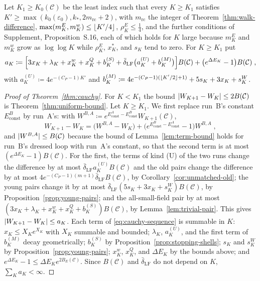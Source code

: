 \documentclass[11pt]{preprint}
\DeclarePairedDelimiter{\abs}{\lvert}{\rvert}
\DeclarePairedDelimiter{\floor}{\lfloor}{\rfloor}
\numberwithin{equation}{section}
\theoremstyle{definition}
\theoremstyle{remark}
\theoremstyle{plain}
\begin{document}
Let $K_1 \geq K_0(\mathcal C)$ be the least index such that every $K \geq K_1$ satisfies $K' \geq \max(k_0(\varepsilon_0), k_*, 2m_{\mathrm{rc}} + 2)$, with $m_{\mathrm{rc}}$ the integer of Theorem~\ref{thm:walk-difference}, $\max(m^E_K, m^w_K) \leq \floor{K'/4}$, $\rho^E_K \leq \frac14$, and the further conditions of Supplement, Proposition~S.16, each of which holds for $K$ large because $m^E_K$ and $m^w_K$ grow as $\log\log K$ while $\rho^E_K$, $x^*_K$, and $s_K$ tend to zero. For $K \geq K_1$ put
\begin{equation}\label{eq:cauchy-sequence}
    a_K \coloneqq \Bigl[3x_K + \lambda_K + x^w_K + x^Q_K + b^{(S)}_K + \bar\delta_{\mathrm{LF}}\bigl(a^{(U)}_K + b^{(M)}_K\bigr)\Bigr]B(\mathcal C) + \bigl(e^{\Delta E_K} - 1\bigr)B(\mathcal C)\;,
\end{equation}
with $a^{(U)}_K \coloneqq 4e^{-(C_P-1)K'}$ and $b^{(M)}_K \coloneqq 4e^{-(C_P-1)(\floor{K'/2}+1)} + 5s_K + 3x_K + s^W_K$.

\begin{proof}[Proof of Theorem~\ref{thm:cauchy}]
For $K < K_1$ the bound $\abs{W_{K+1} - W_K} \leq 2B(\mathcal C)$ is Theorem~\ref{thm:uniform-bound}. Let $K \geq K_1$. We first replace run~B's constant $E^B_{\mathrm{const}}$ by run~A's: with $W^{B,A} \coloneqq e^{E^A_{\mathrm{const}} - E^B_{\mathrm{const}}}W_{K+1}(\mathcal C)$,
\begin{equation}\label{eq:constant-swap}
    W_{K+1} - W_K = \bigl(W^{B,A} - W_K\bigr) + \bigl(e^{E^B_{\mathrm{const}} - E^A_{\mathrm{const}}} - 1\bigr)W^{B,A}\;,
\end{equation}
and $\abs{W^{B,A}} \leq B(\mathcal C)$ because the bound of Lemma~\ref{lem:term-bound} holds for run~B's dressed loop with run~A's constant, so that the second term is at most $(e^{\Delta E_K} - 1)B(\mathcal C)$. For the first, the terms of kind (U) of the two runs change the difference by at most $\bar\delta_{\mathrm{LF}}a^{(U)}_KB(\mathcal C)$ and the old pairs change the difference by at most $4e^{-(C_P-1)(m+1)}\bar\delta_{\mathrm{LF}}B(\mathcal C)$, by Corollary~\ref{cor:unmatched-old}; the young pairs change it by at most $\bar\delta_{\mathrm{LF}}(5s_K + 3x_K + s^W_K)B(\mathcal C)$, by Proposition~\ref{prop:young-pairs}; and the all-small-field pair by at most $(3x_K + \lambda_K + x^w_K + x^Q_K + b^{(S)}_K)B(\mathcal C)$, by Lemma~\ref{lem:trivial-pair}. This gives $\abs{W_{K+1} - W_K} \leq a_K$. Each term of \eqref{eq:cauchy-sequence} is summable in $K$: $x_K \leq X_Ke^{X_K}$ with $X_K$ summable and bounded; $\lambda_K$, $a^{(U)}_K$, and the first term of $b^{(M)}_K$ decay geometrically; $b^{(S)}_K$ by Proposition~\ref{prop:stopping-shells}; $s_K$ and $s^W_K$ by Proposition~\ref{prop:young-pairs}; $x^w_K$, $x^Q_K$, and $\Delta E_K$ by the bounds above; and $e^{\Delta E_K} - 1 \leq \Delta E_Ke^{2B_E(\mathcal C)}$. Since $B(\mathcal C)$ and $\bar\delta_{\mathrm{LF}}$ do not depend on $K$, $\sum_Ka_K < \infty$.
\end{proof}
\end{document}
